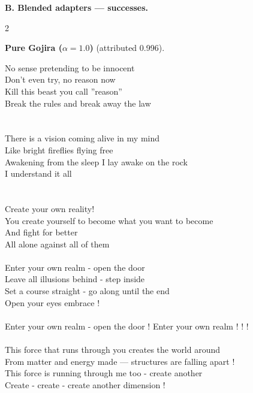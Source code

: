 \newpage
\noindent\textbf{\large B. Blended adapters --- successes.}\par\medskip
\begin{multicols}{2}\raggedright
\nopagebreak\noindent\textbf{Pure Gojira ($\alpha{=}1.0$)} (attributed 0.996).\par\nopagebreak\vspace{4pt}
{\footnotesize\itshape\raggedright
No sense pretending to be innocent \\
Don't even try, no reason now \\
Kill this beast you call ''reason'' \\
Break the rules and break away the law \\
\mbox{} \\
\mbox{} \\
There is a vision coming alive in my mind \\
Like bright fireflies flying free \\
Awakening from the sleep I lay awake on the rock \\
I understand it all \\
\mbox{} \\
\mbox{} \\
Create your own reality! \\
You create yourself to become what you want to become \\
And fight for better \\
All alone against all of them \\
\mbox{} \\
Enter your own realm - open the door \\
Leave all illusions behind - step inside \\
Set a course straight - go along until the end \\
Open your eyes embrace ! \\
\mbox{} \\
Enter your own realm - open the door ! Enter your own realm ! ! ! \\
\mbox{} \\
This force that runs through you creates the world around \\
From matter and energy made --- structures are falling apart ! \\
This force is running through me too  -  create another \\
Create  -  create  -  create  another dimension !\par}
\medskip


\end{multicols}
